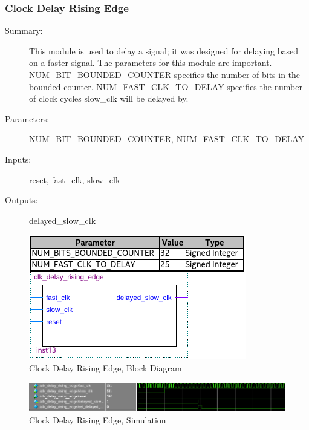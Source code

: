 \documentclass[a4paper]{article}
\begin{document}
    \subsubsection{Clock Delay Rising Edge}
        \begin{description}
            \item[Summary: ] This module is used to delay a signal;  it was designed for delaying based on a faster signal.  The parameters for this module are important.  NUM\_BIT\_BOUNDED\_COUNTER specifies the number of bits in the bounded counter.  NUM\_FAST\_CLK\_TO\_DELAY specifies the number of clock cycles slow\_clk will be delayed by.
            \item[Parameters: ] NUM\_BIT\_BOUNDED\_COUNTER, NUM\_FAST\_CLK\_TO\_DELAY
            \item[Inputs: ] reset, fast\_clk, slow\_clk
            \item[Outputs: ] delayed\_slow\_clk
        \end{description}
        
        \vspace{.25 in}
        \begin{figure}[h]
          \centering
            \includegraphics[width=.5\textwidth]{Images/silas_blocks/clk_delay_rising_edge_bd.png}
        	\caption{Clock Delay Rising Edge, Block Diagram}
            \label{fig:clk_delay_rising_edge_bd}
        \end{figure}
        
        \vspace{.25 in}
        \begin{figure}[h]
          \centering
            \includegraphics[width=5.91in]{Images/silas_sims/clk_delay_rising_edge.png}
        	\caption{Clock Delay Rising Edge, Simulation}
            \label{fig:clk_delay_rising_edge_sim}
        \end{figure}
\end{document}
